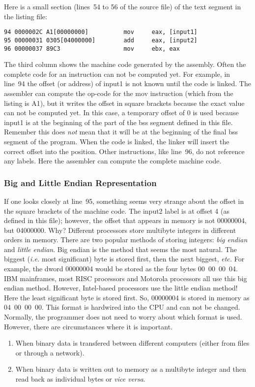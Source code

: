 {Here is a small section (lines~54 to 56 of the source file) of the
text segment in the listing file:
\begin{Verbatim}[xleftmargin=\AsmMargin]
94 0000002C A1[00000000]          mov     eax, [input1]
95 00000031 0305[04000000]        add     eax, [input2]
96 00000037 89C3                  mov     ebx, eax
\end{Verbatim}
The third column shows the machine code generated by the
assembly. Often the complete code for an instruction can not be
computed yet. For example, in line~94 the offset (or address) of
{\code input1} is not known until the code is linked. The assembler
can compute the op-code for the {\code mov} instruction (which from
the listing is A1), but it writes the offset in square brackets
because the exact value can not be computed yet. In this case, a
temporary offset of 0 is used because {\code input1} is at the
beginning of the part of the bss segment defined in this
file. Remember this does \emph{not} mean that it will be at the
beginning of the final bss segment of the program. When the code is linked,
the linker will insert the correct offset into the position. Other 
instructions, like line~96, do not reference any labels. Here the assembler
can compute the complete machine code.

\subsubsection{Big and Little Endian Representation }
If one looks closely at line~95, something seems very strange about
the offset in the square brackets of the machine code. The {\code
input2} label is at offset 4 (as defined in this file); however, the
offset that appears in memory is not 00000004, but 04000000. Why? Different
processors store multibyte integers in different orders in
memory. There are two popular methods of storing integers: \emph{big
endian} and \emph{little endian}.  Big endian is the method that seems the most
natural. The biggest (\emph{i.e.} most significant) byte is stored
first, then the next biggest, \emph{etc.} For example, the dword
00000004 would be stored as the four bytes 00~00~00~04.  IBM
mainframes, most RISC processors and Motorola processors all use this
big endian method. However, Intel-based processors use the little
endian method! Here the least significant byte is stored first. So,
00000004 is stored in memory as 04~00~00~00. This format is hardwired
into the CPU and can not be changed. Normally, the programmer does not
need to worry about which format is used. However, there are
circumstances where it is important.
\begin{enumerate}
\item When binary data is transfered between different computers (either from
      files or through a network).
\item When binary data is written out to memory as a multibyte integer and
      then read back as individual bytes or \emph{vice versa}.
\end{enumerate}

}
